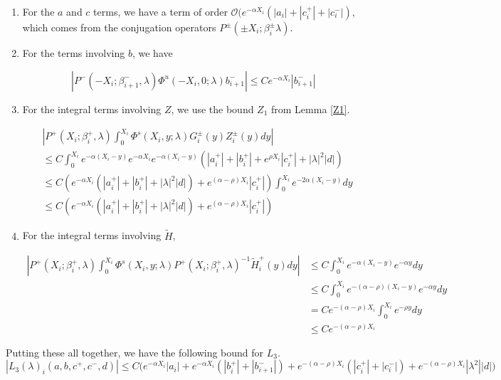 \documentclass[12pt]{article}
\begin{document}
\begin{enumerate}
\item For the $a$ and $c$ terms, we have a term of order $\mathcal{O}(e^{-\alpha X_i}(|a_i| + |c_i^+| + |c_i^-|)$, which comes from the conjugation operators $P^\pm(\pm X_i; \beta_i^\pm \lambda)$.

\item For the terms involving $b$, we have

\[
| P^-(-X_i; \beta_{i+1}^-, \lambda) \Phi^u(-X_i, 0; \lambda) b_{i+1}^-| \leq C e^{-\alpha X_i} |b_{i+1}
^-|
\]

\item For the integral terms involving $Z$, we use the bound $Z_1$ from Lemma \ref{Z1}.

\begin{align*}
&\left|
P^+(X_i; \beta_i^+, \lambda) \int_0^{X_i} \Phi^s(X_i, y; \lambda) G_i^\pm(y) Z_i^\pm(y) dy \right| \\
&\leq C \int_0^{X_i} e^{-\alpha(X_i - y)} e^{-\alpha X_i} e^{-\alpha(X_i - y)} ( |a_i^+| + |b_i^+| + e^{\rho X_i} |c_i^+| + |\lambda|^2 |d| ) \\
&\leq C \left( e^{-\alpha X_i} ( |a_i^+| + |b_i^+| + |\lambda|^2 |d| ) + e^{(\alpha - \rho) X_i} |c_i^+| \right) \int_0^{X_i} e^{-2 \alpha(X_i - y)} dy \\
&\leq C \left( e^{-\alpha X_i} ( |a_i^+| + |b_i^+| + |\lambda|^2 |d| ) + e^{(\alpha - \rho) X_i} |c_i^+| \right)
\end{align*}

\item For the integral terms involving $\tilde{H}$,

\begin{align*}
\left|
P^+(X_i; \beta_i^+, \lambda) \int_0^{X_i} \Phi^s(X_i, y; \lambda) P^+(X_i; \beta_i^+, \lambda)^{-1} \tilde{H}_i^+(y) dy \right|
&\leq C \int_0^{X_i} e^{-\alpha(X_i - y)}e^{-\alpha y} dy \\
&\leq C \int_0^{X_i} e^{-(\alpha - \rho)(X_i - y)}e^{-\alpha y} dy \\
&= C e^{-(\alpha - \rho) X_i} \int_0^{X_i} e^{-\rho y} dy \\ 
&\leq C e^{-(\alpha - \rho) X_i} 
\end{align*}

\end{enumerate}

Putting these all together, we have the following bound for $L_3$.
\[
|L_3(\lambda)_i(a, b, c^+, c^-, d)| \leq C \Big( e^{-\alpha X_i} |a_i| + e^{-\alpha X_i} (|b_i^+| + |b_{i+1}^-|) + e^{-(\alpha - \rho) X_i} (|c_i^+| + |c_i^-|) + e^{-(\alpha - \rho) X_i} |\lambda^2| |d| \Big)
\]
\end{document}
